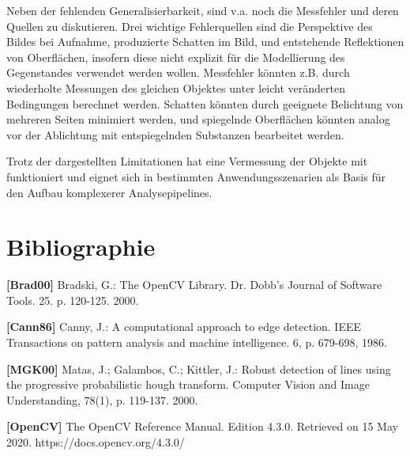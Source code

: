 \documentclass{article}
\begin{document}
Neben der fehlenden Generalisierbarkeit, sind v.a. noch die Messfehler und deren Quellen zu diskutieren. Drei wichtige Fehlerquellen sind die Perspektive des Bildes bei Aufnahme, produzierte Schatten im Bild, und entstehende Reflektionen von Oberflächen, insofern diese nicht explizit für die Modellierung des Gegenstandes verwendet werden wollen. Messfehler könnten z.B. durch wiederholte Messungen des gleichen Objektes unter leicht veränderten Bedingungen berechnet werden. Schatten könnten durch geeignete Belichtung von mehreren Seiten minimiert werden, und spiegelnde Oberflächen könnten analog vor der Ablichtung mit entspiegelnden Substanzen bearbeitet werden.

Trotz der dargestellten Limitationen hat eine Vermessung der Objekte mit  funktioniert und eignet sich in bestimmten Anwendungsszenarien als Basis für den Aufbau komplexerer Analysepipelines.

\section*{Bibliographie}

\noindent\textbf{[Brad00]} Bradski, G.: The OpenCV Library. Dr. Dobb's Journal of Software Tools. 25. p. 120-125. 2000.

\noindent\textbf{[Cann86]} Canny, J.: A computational approach to edge detection. IEEE Transactions on pattern analysis and machine intelligence. 6, p. 679-698, 1986.

\noindent\textbf{[MGK00]} Matas, J.; Galambos, C.; Kittler, J.: Robust detection of lines using the progressive probabilistic hough transform. Computer Vision and Image Understanding, 78(1), p. 119-137. 2000.

\noindent\textbf{[OpenCV]} The OpenCV Reference Manual. Edition 4.3.0. Retrieved on 15 May 2020. https://docs.opencv.org/4.3.0/ 
\end{document}

